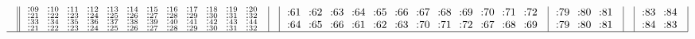 \documentclass[12pt,a4paper]{amsart}
\begin{document}
\begin{align*}
\begin{array}{r||c|c|c|c|c|c|c}
&
  \begin{array}{cccccccccccc}
^{\llap:09}_{\llap:21}&^{\llap:10}_{\llap:22}&^{\llap:11}_{\llap:23}&^{\llap:12}_{\llap:24}&^{\llap:13}_{\llap:25}&^{\llap:14}_{\llap:26}&^{\llap:15}_{\llap:27}&^{\llap:16}_{\llap:28}&^{\llap:17}_{\llap:29}&^{\llap:18}_{\llap:30}&^{\llap:19}_{\llap:31}&^{\llap:20}_{\llap:32}\\
^{\llap:33}_{\llap:21}&^{\llap:34}_{\llap:22}&^{\llap:35}_{\llap:23}&^{\llap:36}_{\llap:24}&^{\llap:37}_{\llap:25}&^{\llap:38}_{\llap:26}&^{\llap:39}_{\llap:27}&^{\llap:40}_{\llap:28}&^{\llap:41}_{\llap:29}&^{\llap:42}_{\llap:30}&^{\llap:43}_{\llap:31}&^{\llap:44}_{\llap:32}\\
  \end{array}
&
&
  \begin{array}{cccccccccccc}
\llap:61&\llap:62&\llap:63&\llap:64&\llap:65&\llap:66&\llap:67&\llap:68&\llap:69&\llap:70&\llap:71&\llap:72\\
\llap:64&\llap:65&\llap:66&\llap:61&\llap:62&\llap:63&\llap:70&\llap:71&\llap:72&\llap:67&\llap:68&\llap:69\\
  \end{array}
&
  \begin{array}{ccc}
    \llap:79&\llap:80&\llap:81\\
    \llap:79&\llap:80&\llap:81\\
  \end{array}
&
&
  \begin{array}{cc}
    \llap:83&\llap:84\\
    \llap:84&\llap:83\\
  \end{array}
\\\hline
  \end{array}
\end{align*}
\end{document}
